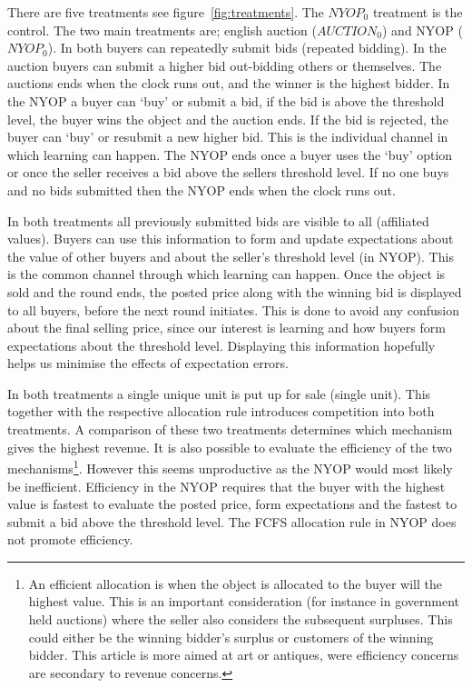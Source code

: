 \documentclass[a4paper,12pt]{article}
\begin{document}
	There are five treatments see figure~\ref{fig:treatments}. The $NYOP_0$ treatment is the control. The two main treatments are; english auction ($AUCTION_0$) and NYOP ($NYOP_0$).
	In both buyers can repeatedly submit bids (repeated bidding). In the auction buyers can submit a higher bid out-bidding others or themselves. The auctions ends when the clock runs out, and the winner is the highest bidder. In the NYOP a buyer can `buy' or submit a bid, if the bid is above the threshold level, the buyer wins the object and the auction ends. If the bid is rejected, the buyer can `buy' or resubmit a new higher bid. This is the individual channel in which learning can happen. The NYOP ends once a buyer uses the `buy' option or once the seller receives a bid above the sellers threshold level. If no one buys and no bids submitted then the NYOP ends when the clock runs out.

	In both treatments all previously submitted bids are visible to all (affiliated values). Buyers can use this information to form and update expectations about the value of other buyers and about the seller's threshold level (in NYOP). This is the common channel through which learning can happen. Once the object is sold and the round ends, the posted price along with the winning bid is displayed to all buyers, before the next round initiates. This is done to avoid any confusion about the final selling price, since our interest is learning and how buyers form expectations about the threshold level. Displaying this information hopefully helps us minimise the effects of expectation errors.

	In both treatments a single unique unit is put up for sale (single unit). This together with the respective allocation rule introduces competition into both treatments. A comparison of these two treatments determines which mechanism gives the highest revenue. It is also possible to evaluate the efficiency of the two mechanisms\footnote{\label{footnote:efficient}An efficient allocation is when the object is allocated to the buyer will the highest value. This is an important consideration (for instance in government held auctions) where the seller also considers the subsequent surpluses. This could either be the winning bidder's surplus or customers of the winning bidder. This article is more aimed at art or antiques, were efficiency concerns are secondary to revenue concerns.}. However this seems unproductive as the NYOP would most likely be inefficient. Efficiency in the NYOP requires that the buyer with the highest value is fastest to evaluate the posted price, form expectations and the fastest to submit a bid above the threshold level. The FCFS allocation rule in NYOP does not promote efficiency. 
\end{document}
